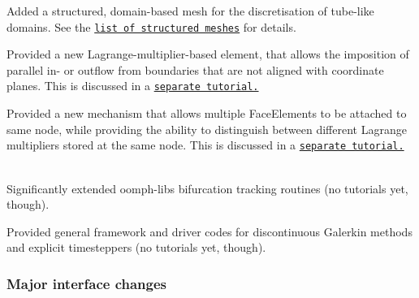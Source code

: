 \begin{DoxyItemize}
\item Added a structured, domain-\/based mesh for the discretisation of tube-\/like domains. See the \href{../../meshes/mesh_list/html/index.html}{\tt list of structured meshes} for details. ~\newline
~\newline

\item Provided a new Lagrange-\/multiplier-\/based element, that allows the imposition of parallel in-\/ or outflow from boundaries that are not aligned with coordinate planes. This is discussed in a \href{../../navier_stokes/vmtk_fluid/html/index.html}{\tt separate tutorial.} ~\newline
~\newline

\item Provided a new mechanism that allows multiple {\ttfamily Face\+Elements} to be attached to same node, while providing the ability to distinguish between different Lagrange multipliers stored at the same node. This is discussed in a \href{../../interaction/vmtk_fsi/html/index.html}{\tt separate tutorial.} ~\newline
~\newline

\item Significantly extended oomph-\/lib\textquotesingle{}s bifurcation tracking routines (no tutorials yet, though). ~\newline
~\newline

\item Provided general framework and driver codes for discontinuous Galerkin methods and explicit timesteppers (no tutorials yet, though). ~\newline
~\newline

\end{DoxyItemize}



\hypertarget{index_major_interface_changes_zero_point_nine}{}\subsubsection{Major interface changes}\label{index_major_interface_changes_zero_point_nine}

